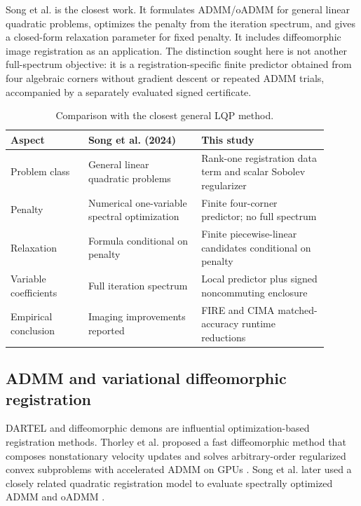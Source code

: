 \documentclass[pdflatex,iicol,sn-mathphys-num]{sn-jnl}
\theoremstyle{definition}\newtheorem{definition}[theorem]{Definition}\newtheorem{remark}[theorem]{Remark}
\begin{document}
Song et al. \cite{Song2024} is the closest work. It formulates ADMM/oADMM for general linear quadratic problems, optimizes the penalty from the iteration spectrum, and gives a closed-form relaxation parameter for fixed penalty. It includes diffeomorphic image registration as an application. The distinction sought here is not another full-spectrum objective: it is a registration-specific finite predictor obtained from four algebraic corners without gradient descent or repeated ADMM trials, accompanied by a separately evaluated signed certificate.

\begin{table}[ht]
\centering
\caption{Comparison with the closest general LQP method.}
\begin{tabular}{p{0.22\linewidth}p{0.32\linewidth}p{0.36\linewidth}}
\toprule
Aspect & Song et al. (2024) & This study\\
\midrule
Problem class & General linear quadratic problems & Rank-one registration data term and scalar Sobolev regularizer\\
Penalty & Numerical one-variable spectral optimization & Finite four-corner predictor; no full spectrum\\
Relaxation & Formula conditional on penalty & Finite piecewise-linear candidates conditional on penalty\\
Variable coefficients & Full iteration spectrum & Local predictor plus signed noncommuting enclosure\\
Empirical conclusion & Imaging improvements reported & FIRE and CIMA matched-accuracy runtime reductions\\
\bottomrule
\end{tabular}
\end{table}

\subsection{ADMM and variational diffeomorphic registration}
DARTEL \cite{Ashburner2007} and diffeomorphic demons \cite{Vercauteren2009} are influential optimization-based registration methods. Thorley et al. proposed a fast diffeomorphic method that composes nonstationary velocity updates and solves arbitrary-order regularized convex subproblems with accelerated ADMM on GPUs \cite{Thorley2021}. Song et al. later used a closely related quadratic registration model to evaluate spectrally optimized ADMM and oADMM \cite{Song2024}.
\end{document}
